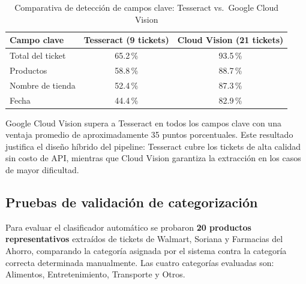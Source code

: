 \begin{table}[H]
  \centering
  \small
  \caption{Comparativa de detección de campos clave: Tesseract vs.\ Google Cloud Vision}
  \label{tab:ocr-comparativa}
  \begin{tabular}{l c c}
    \toprule
    \textbf{Campo clave} & \textbf{Tesseract (9 tickets)} & \textbf{Cloud Vision (21 tickets)} \\
    \midrule
    Total del ticket & 65.2\,\% & 93.5\,\% \\
    Productos        & 58.8\,\% & 88.7\,\% \\
    Nombre de tienda & 52.4\,\% & 87.3\,\% \\
    Fecha            & 44.4\,\% & 82.9\,\% \\
    \bottomrule
  \end{tabular}
\end{table}

Google Cloud Vision supera a Tesseract en todos los campos clave con una ventaja promedio de aproximadamente 35 puntos porcentuales. Este resultado justifica el diseño híbrido del pipeline: Tesseract cubre los tickets de alta calidad sin costo de API, mientras que Cloud Vision garantiza la extracción en los casos de mayor dificultad.

\subsection{Pruebas de validación de categorización}

Para evaluar el clasificador automático se probaron \textbf{20 productos representativos} extraídos de tickets de Walmart, Soriana y Farmacias del Ahorro, comparando la categoría asignada por el sistema contra la categoría correcta determinada manualmente. Las cuatro categorías evaluadas son: Alimentos, Entretenimiento, Transporte y Otros.

